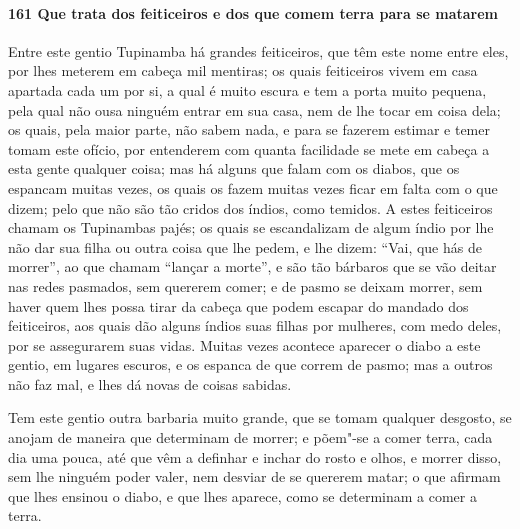 \begin{linenumbers}
\paragraph{161 Que trata dos feiticeiros e dos que comem terra para se matarem}\quad
Entre este gentio Tupinamba há grandes feiticeiros, que têm este nome entre eles, por lhes
meterem em cabeça mil mentiras; os quais feiticeiros vivem em casa apartada cada um por
si, a qual é muito escura e tem a porta muito pequena, pela qual não ousa ninguém entrar
em sua casa, nem de lhe tocar em coisa dela; os quais, pela maior parte, não sabem nada, e
para se fazerem estimar e temer tomam este ofício, por entenderem com quanta facilidade se
mete em cabeça a esta gente qualquer coisa; mas há alguns que falam com os diabos, que os
espancam muitas vezes, os quais os fazem muitas vezes ficar em falta com o que dizem; pelo
que não são tão cridos dos índios, como temidos. A estes feiticeiros chamam os Tupinambas
pajés; os quais se escandalizam de algum índio por lhe não dar sua filha ou outra coisa
que lhe pedem, e lhe dizem: ``Vai, que hás de morrer'', ao que chamam ``lançar a morte'',
e são tão bárbaros que se vão deitar nas redes pasmados, sem quererem comer; e de pasmo se
deixam morrer, sem haver quem lhes possa tirar da cabeça que podem escapar do mandado dos
feiticeiros, aos quais dão alguns índios suas filhas por mulheres, com medo deles, por se
assegurarem suas vidas. Muitas vezes acontece aparecer o diabo a este gentio, em lugares
escuros, e os espanca de que correm de pasmo; mas a outros não faz mal, e lhes dá novas de
coisas sabidas.

Tem este gentio outra barbaria muito grande, que se tomam qualquer desgosto, se anojam de
maneira que determinam de morrer; e põem"-se a comer terra, cada dia uma pouca, até que vêm
a definhar e inchar do rosto e olhos, e morrer disso, sem lhe ninguém poder valer, nem
desviar de se quererem matar; o que afirmam que lhes ensinou o diabo, e que lhes aparece,
como se determinam a comer a terra.


\end{linenumbers}
